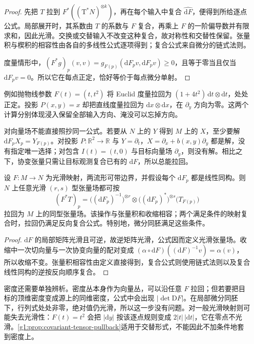 \begin{proof}
	先把 \(T\) 拉到 \(F^*((\mathrm{T}^*N)^{\otimes k})\)，再在每个输入中复合 \(\widehat{\mathrm{d}F}\)，便得到所给逐点公式。局部展开时，其系数由 \(T\) 的系数与 \(F\) 复合，再乘上 \(F\) 的一阶偏导数并有限求和，因此光滑。交换或交替输入不改变这种复合，故对称性和交替性保留。张量积与楔积的相容性由各自的多线性公式逐项得到；复合公式来自微分的链式法则。

	度量情形中，\((F^*g)_p(v,v)=g_{F(p)}(\mathrm{d}F_pv,\mathrm{d}F_pv)\geq0\)，且等于零当且仅当 \(\mathrm{d}F_pv=0\)。所以它在每点正定，恰好等价于每点微分单射。
\end{proof}

例如抛物线参数 \(F(t)=(t,t^2)\) 将 Euclid 度量拉回为 \((1+4t^2)\,\mathrm{d}t\otimes\mathrm{d}t\)，处处正定。投影 \(P(x,y)=x\) 却把直线度量拉回为 \(\mathrm{d}x\otimes\mathrm{d}x\)，在 \(\partial_y\) 方向为零。这两个计算分别体现浸入保留全部输入方向、淹没可以忘掉方向。

\ProseParagraphBreak

对向量场不能直接照抄同一公式。若要从 \(N\) 上的 \(Y\) 得到 \(M\) 上的 \(X\)，至少要解 \(\mathrm{d}F_pX_p=Y_{F(p)}\)。对投影 \(P:\mathbb R^2\to\mathbb R\) 与 \(Y=\partial_t\)，\(X=\partial_x+b(x,y)\partial_y\) 都是解，没有指定唯一选择；对包含 \(I(t)=(t,0)\) 与目标向量场 \(\partial_y\)，则没有解。相比之下，协变张量只需让目标观测复合已有的 \(\mathrm{d}F\)，所以总能拉回。

\begin{proposition}
	\label{g1:prop:mixed-tensor-pullback}
	设 \(F:M\to N\) 为光滑映射，两流形可带边界，并假设每个 \(\mathrm{d}F_p\) 都是线性同构。则 \(N\) 上任意光滑 \((r,s)\) 型张量场都可按
	\[
		(F^*T)_p=
		\bigl((\mathrm{d}F_p)^{-1}\bigr)^{\otimes r}
		\otimes\bigl((\mathrm{d}F_p)^*\bigr)^{\otimes s}
		\bigl(T_{F(p)}\bigr)
	\]
	拉回为 \(M\) 上的同型张量场。该操作与张量积和收缩相容；两个满足条件的映射复合时，拉回仍满足反向复合公式。特别地，微分同胚满足这些条件。
\end{proposition}

\begin{proof}
	\(\mathrm{d}F\) 的局部矩阵光滑且可逆，故逆矩阵光滑，公式因而定义光滑张量场。收缩中一次切向量与一次协变向量的配对变成 \((\alpha\circ\mathrm{d}F)((\mathrm{d}F)^{-1}v)=\alpha(v)\)，所以收缩不变。张量积相容性由定义直接得到，复合公式则使用链式法则以及复合线性同构的逆按反向顺序复合。
\end{proof}

密度还需要单独辨析。密度丛本身作为向量丛，可以沿任意 \(F\) 拉回；但若要把目标的顶维密度变成源上的同维密度，公式中会出现 \(|\det \mathrm{D}F|\)。在局部微分同胚下，行列式处处非零，绝对值仍光滑，所以这一步没有问题。对一般光滑映射则可能失去光滑性：\(F(t)=t^2\) 会把 \(|\mathrm{d}y|\) 按该逐点规则变成 \(2|t|\,|\mathrm{d}t|\)，它在零点不光滑。\cref{g1:prop:covariant-tensor-pullback}适用于交替形式，不能因此不加条件地套到密度上。

